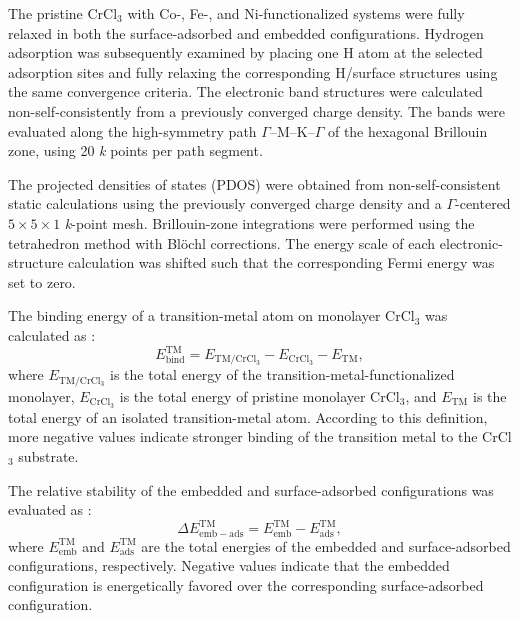 \documentclass[journal=jacsat,manuscript=article]{achemso}
\begin{document}
{\color{revcolor} %
  The pristine CrCl$_3$ with Co-, Fe-, and Ni-functionalized systems were fully relaxed in both the surface-adsorbed and embedded configurations.%
} Hydrogen adsorption was subsequently examined by placing one H atom at the selected adsorption sites and fully relaxing the corresponding H/surface structures using the same convergence criteria. The electronic band structures were calculated non-self-consistently from a previously converged charge density.  The bands were evaluated along the high-symmetry path $\Gamma$--M--K--$\Gamma$ of the hexagonal Brillouin zone, using 20 \textit{k} points per path segment.

The projected densities of states (PDOS) were obtained from non-self-consistent static calculations using the previously converged charge density and a $\Gamma$-centered $5 \times 5 \times 1$ \textit{k}-point mesh. Brillouin-zone integrations were performed using the tetrahedron method with Blöchl corrections. The energy scale of each electronic-structure calculation was shifted such that the corresponding Fermi energy was set to zero.

The binding energy of a transition-metal atom on monolayer CrCl$_3$ was calculated as \cite{Liao2022,Sholl2009DensityTheory,Martin2004ElectronicMethods}:
\begin{equation}
  E_{\mathrm{bind}}^{\mathrm{TM}}
  =
  E_{\mathrm{TM/CrCl_3}}
  -
  E_{\mathrm{CrCl_3}}
  -
  E_{\mathrm{TM}},
  \label{eq:TM_binding}
\end{equation}
where $E_{\mathrm{TM/CrCl_3}}$ is the total energy of the transition-metal-functionalized monolayer, $E_{\mathrm{CrCl_3}}$ is the total energy of pristine monolayer CrCl$_3$, and $E_{\mathrm{TM}}$ is the total energy of an isolated transition-metal atom. According to this definition, more negative values indicate stronger binding of the transition metal to the CrCl$_3$ substrate.

The relative stability of the embedded and surface-adsorbed configurations was evaluated as \cite{Liao2022,Sholl2009DensityTheory,Martin2004ElectronicMethods}:
\begin{equation}
  \Delta E_{\mathrm{emb-ads}}^{\mathrm{TM}}
  =
  E_{\mathrm{emb}}^{\mathrm{TM}}
  -
  E_{\mathrm{ads}}^{\mathrm{TM}},
  \label{eq:relative_stability}
\end{equation}
where $E_{\mathrm{emb}}^{\mathrm{TM}}$ and $E_{\mathrm{ads}}^{\mathrm{TM}}$ are the total energies of the embedded and surface-adsorbed configurations, respectively. Negative values indicate that the embedded configuration is energetically favored over the corresponding surface-adsorbed configuration.
\end{document}
